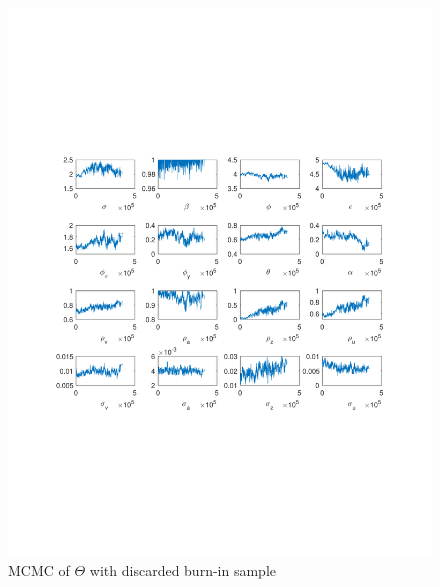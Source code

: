 \documentclass[12pt]{article}
\theoremstyle{definition}
\begin{document}
\begin{figure}[H]
	\centering
	\includegraphics[width=\linewidth]{burn_MCMC}
	\caption{MCMC of $\Theta$ with discarded burn-in sample}
	\label{fig:burn}
\end{figure}
\end{document}

